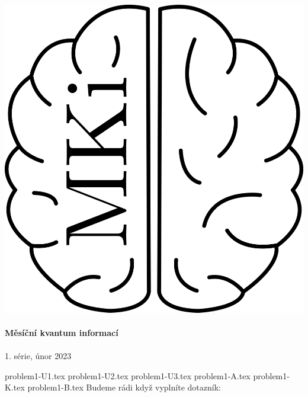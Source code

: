 \documentclass[12pt]{article}
\begin{document}
\thispagestyle{firststyle}
\vspace*{\fill}
\begin{center}
\includegraphics[scale=1]{../../../propagace/logo/mkilogo.png}\\
\quad\\
\textbf{\Huge{Měsíční kvantum informací}}\\
\quad\\
\LARGE{1. série, únor 2023}
\end{center}
\vspace*{\fill}

\newpage
{problem1-U1.tex}
\newpage
{problem1-U2.tex}
{problem1-U3.tex}
{problem1-A.tex}
{problem1-K.tex}
{problem1-B.tex}
\newpage
Budeme rádi když vyplníte dotazník:\\

\vspace*{\fill}
\end{document}
